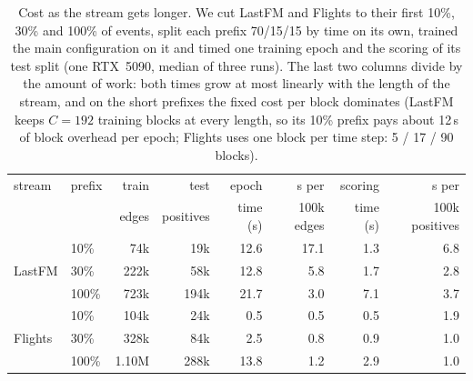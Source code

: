 \begin{table}[t]
\caption{Cost as the stream gets longer. We cut LastFM and Flights to their first 10\%, 30\% and 100\% of events, split each prefix 70/15/15 by time on its own, trained the main configuration on it and timed one training epoch and the scoring of its test split (one RTX~5090, median of three runs). The last two columns divide by the amount of work: both times grow at most linearly with the length of the stream, and on the short prefixes the fixed cost per block dominates (LastFM keeps $C=192$ training blocks at every length, so its 10\% prefix pays about 12\,s of block overhead per epoch; Flights uses one block per time step: 5 / 17 / 90 blocks).}
\label{tab:s2_stream_length}
\centering
\footnotesize
\setlength{\tabcolsep}{5pt}
\begin{tabular}{llrrrrrr}
\toprule
stream & prefix & train & test & epoch & s per & scoring & s per \\
 & & edges & positives & time (s) & 100k edges & time (s) & 100k positives \\
\midrule
\multirow{3}{*}{LastFM} & 10\% & 74k & 19k & 12.6 & 17.1 & 1.3 & 6.8 \\
 & 30\% & 222k & 58k & 12.8 & 5.8 & 1.7 & 2.8 \\
 & 100\% & 723k & 194k & 21.7 & 3.0 & 7.1 & 3.7 \\
\midrule
\multirow{3}{*}{Flights} & 10\% & 104k & 24k & 0.5 & 0.5 & 0.5 & 1.9 \\
 & 30\% & 328k & 84k & 2.5 & 0.8 & 0.9 & 1.0 \\
 & 100\% & 1.10M & 288k & 13.8 & 1.2 & 2.9 & 1.0 \\
\bottomrule
\end{tabular}
\end{table}
